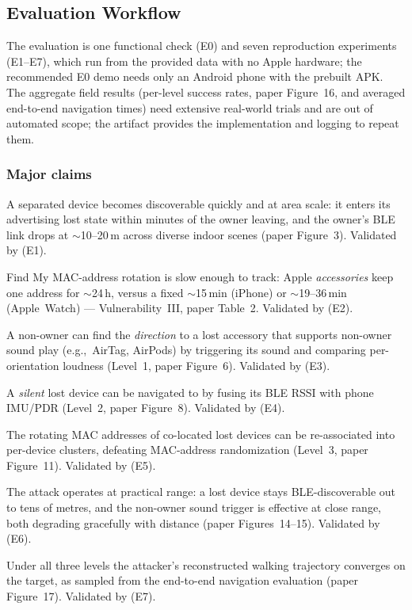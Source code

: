 \documentclass[nonacm,sigconf]{acmart}
\begin{document}
\subsection{Evaluation Workflow}
The evaluation is one functional check (E0) and seven reproduction experiments
(E1--E7), which run from the provided data with no Apple hardware; the
recommended E0 demo needs only an Android phone with the prebuilt APK. The
aggregate field results (per-level success rates, paper Figure~16, and averaged
end-to-end navigation times) need extensive real-world trials and are out of
automated scope; the artifact provides the implementation and logging to repeat
them.

\subsubsection{Major claims}
\begin{compactitem}
\item[(C1):] A separated device becomes discoverable quickly and at area scale:
  it enters its advertising lost state within minutes of the owner leaving, and
  the owner's BLE link drops at $\sim$10--20\,m across diverse indoor scenes
  (paper Figure~3). Validated by (E1).
\item[(C2):] Find My MAC-address rotation is slow enough to track: Apple
  \emph{accessories} keep one address for $\sim$24\,h, versus a fixed
  $\sim$15\,min (iPhone) or $\sim$19--36\,min (Apple~Watch) ---
  Vulnerability~III, paper Table~2. Validated by (E2).
\item[(C3):] A non-owner can find the \emph{direction} to a lost accessory that
  supports non-owner sound play (e.g.,\ AirTag, AirPods) by triggering its sound
  and comparing per-orientation loudness (Level~1, paper Figure~6). Validated by (E3).
\item[(C4):] A \emph{silent} lost device can be navigated to by fusing its BLE
  RSSI with phone IMU/PDR (Level~2, paper Figure~8). Validated by (E4).
\item[(C5):] The rotating MAC addresses of co-located lost devices can be
  re-associated into per-device clusters, defeating MAC-address randomization
  (Level~3, paper Figure~11). Validated by (E5).
\item[(C6):] The attack operates at practical range: a lost device stays
  BLE-discoverable out to tens of metres, and the non-owner sound trigger is
  effective at close range, both degrading gracefully with distance (paper
  Figures~14--15). Validated by (E6).
\item[(C7):] Under all three levels the attacker's reconstructed walking
  trajectory converges on the target, as sampled from the end-to-end navigation
  evaluation (paper Figure~17). Validated by (E7).
\end{compactitem}
\end{document}
